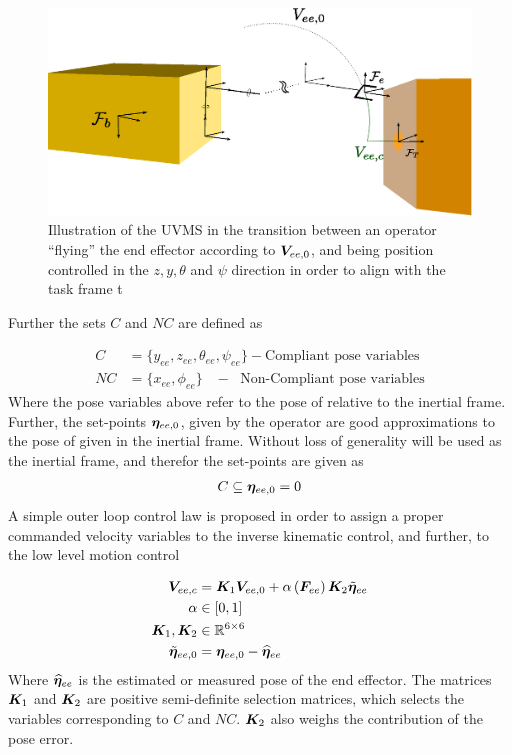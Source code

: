 \begin{figure}[h!]
	\centering
	\includegraphics[scale=0.7]{./figures/uvms_hot_stab2.eps}
	\caption{Illustration of the UVMS in the transition between an operator ``flying'' the end effector according to $\boldsymbol V_{ee,0}$, and being position controlled in the $z,y,\theta $ and $ \psi$ direction in order to align with the task frame \frame t}
	\label{fig:hot_stab2}
\end{figure}
Further the sets $C$ and $NC$ are defined as

\begin{align*}
	C&=\{y_{ee},z_{ee},\theta_{ee},\psi_{ee}\} - \text{Compliant pose variables}
	\\
	NC&=\{x_{ee},\phi_{ee}\} \; \; \; - \; \text{ Non-Compliant pose variables}
\end{align*}
Where the pose variables above refer to the pose of  relative to the inertial frame. Further, the set-points $\boldsymbol \eta_{ee,0}$, given by the operator are good approximations to the pose of  given in the inertial frame. Without loss of generality  will be used as the inertial frame, and therefor the set-points are given as  
\begin{align}
C \subseteq	\boldsymbol \eta_{ee,0}=0
	\label{eq:subset}
\end{align}
A simple outer loop control law is proposed in order to assign a proper commanded velocity variables to the inverse kinematic control, and further, to the low level motion control

\begin{align}
	\boldsymbol V_{ee,c} &= \boldsymbol K_{1}\boldsymbol V_{ee,0} + \alpha \left( \boldsymbol F_{ee} \right) \boldsymbol K_{2} \tilde{\boldsymbol \eta}_{ee} 
	\label{eq:control_law1}
	\\
	\alpha &\in \left[ 0,1\right]
	\\
	\boldsymbol K_{1},\boldsymbol K_{2}&\in \mathbb{R}^{6 \times 6} \\
	\tilde{\boldsymbol \eta}_{ee,0}&= \boldsymbol \eta_{ee,0} - \widehat{\boldsymbol \eta}_{ee}
\end{align}
Where $\widehat{\boldsymbol \eta}_{ee}$ is the estimated or measured pose of the end effector. The matrices $\boldsymbol K_{1}$ and $ \boldsymbol K_{2}$ are positive semi-definite selection matrices, which selects the variables corresponding to $C$ and $NC$. $\boldsymbol K_{2}$ also weighs the contribution of the pose error.  

